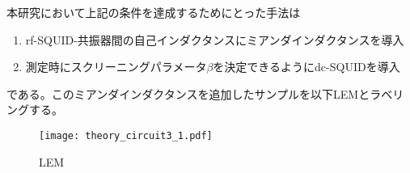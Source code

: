 本研究において上記の条件を達成するためにとった手法は
\begin{enumerate}
    \item rf-SQUID-共振器間の自己インダクタンスにミアンダインダクタンスを導入
    \item 測定時にスクリーニングパラメータ$\beta$を決定できるようにdc-SQUIDを導入
 \end{enumerate}
 である。このミアンダインダクタンスを追加したサンプルを以下LEMとラベリングする。
 \begin{figure}[H]
    \centering
    \texttt{[image: theory\_circuit3\_1.pdf]}
    \caption{LEM}
\end{figure}



